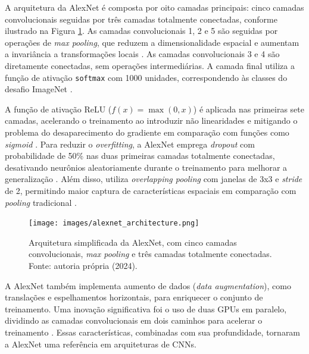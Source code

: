 A arquitetura da AlexNet é composta por oito camadas principais: cinco camadas convolucionais seguidas por três camadas totalmente conectadas, conforme ilustrado na Figura \ref{fig:alexnet}. As camadas convolucionais 1, 2 e 5 são seguidas por operações de \textit{max pooling}, que reduzem a dimensionalidade espacial e aumentam a invariância a transformações locais \cite{Goodfellow2016}. As camadas convolucionais 3 e 4 são diretamente conectadas, sem operações intermediárias. A camada final utiliza a função de ativação \texttt{softmax} com 1000 unidades, correspondendo às classes do desafio ImageNet \cite{Krizhevsky2012}.

A função de ativação ReLU (\(f(x) = \max(0, x)\)) é aplicada nas primeiras sete camadas, acelerando o treinamento ao introduzir não linearidades e mitigando o problema do desaparecimento do gradiente em comparação com funções como \textit{sigmoid} \cite{Braga2024}. Para reduzir o \textit{overfitting}, a AlexNet emprega \textit{dropout} com probabilidade de 50\% nas duas primeiras camadas totalmente conectadas, desativando neurônios aleatoriamente durante o treinamento para melhorar a generalização \cite{Hinton2012}. Além disso, utiliza \textit{overlapping pooling} com janelas de 3x3 e \textit{stride} de 2, permitindo maior captura de características espaciais em comparação com \textit{pooling} tradicional \cite{Krizhevsky2012}.

\begin{figure}
    \centering
    \texttt{[image: images/alexnet\_architecture.png]}
    \caption{Arquitetura simplificada da AlexNet, com cinco camadas convolucionais, \textit{max pooling} e três camadas totalmente conectadas. Fonte: autoria própria (2024).}
    \label{fig:alexnet}
\end{figure}

A AlexNet também implementa aumento de dados (\textit{data augmentation}), como translações e espelhamentos horizontais, para enriquecer o conjunto de treinamento. Uma inovação significativa foi o uso de duas GPUs em paralelo, dividindo as camadas convolucionais em dois caminhos para acelerar o treinamento \cite{Krizhevsky2012}. Essas características, combinadas com sua profundidade, tornaram a AlexNet uma referência em arquiteturas de CNNs.




























